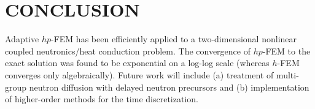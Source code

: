 \section*{CONCLUSION}
\vspace{-4mm}
Adaptive $hp$-FEM has been efficiently applied to a two-dimensional nonlinear coupled neutronics/heat conduction problem.  The convergence of $hp$-FEM to the exact solution was found to be exponential on a log-log scale (whereas $h$-FEM converges only algebraically).
%
Future work will include (a) treatment of multi-group neutron diffusion with delayed neutron precursors and (b) implementation of higher-order methods for the time discretization.


